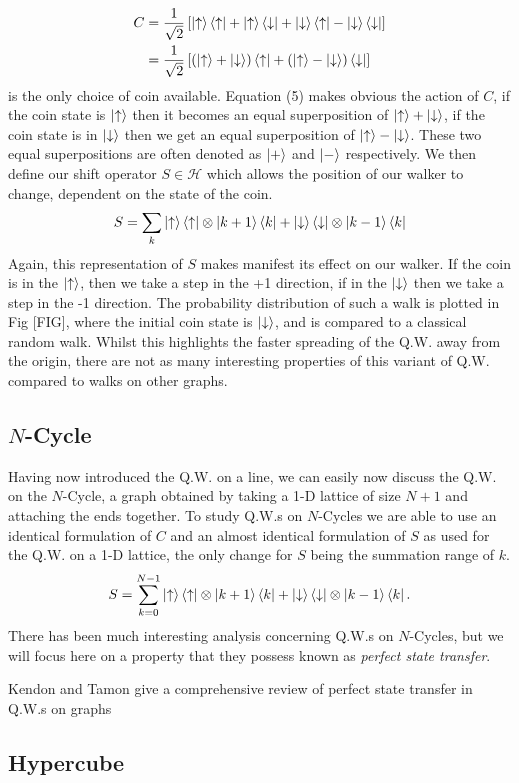 \begin{align}
    C &= \frac{1}{\sqrt{2}}\left[
    \ket{\uparrow}\bra{\uparrow} +
    \ket{\uparrow}\bra{\downarrow} +
    \ket{\downarrow}\bra{\uparrow} -
    \ket{\downarrow}\bra{\downarrow}\right]\\
    &= \frac{1}{\sqrt{2}}\left[(\ket{\uparrow} + \ket{\downarrow})\bra{\uparrow} +
    (\ket{\uparrow} - \ket{\downarrow})\bra{\downarrow}\right]
\end{align}
is the only choice of coin available. 
Equation (5) makes obvious the action of $C$, if the coin state is $\ket{\uparrow}$ then it becomes an equal superposition of $\ket{\uparrow} + \ket{\downarrow}$, if the coin state is in $\ket{\downarrow}$ then we get an equal superposition of $\ket{\uparrow} - \ket{\downarrow}$. 
These two equal superpositions are often denoted as $\ket{+}$ and $\ket{-}$ respectively.\newline
We then define our shift operator $S \in \mathcal{H}$ which allows the position of our walker to change, dependent on the state of the coin.
\begin{equation}
    S = \sum_k \ket{\uparrow}\bra{\uparrow} \otimes \ket{k + 1}\bra{k} + \ket{\downarrow}\bra{\downarrow} \otimes \ket{k - 1}\bra{k}
\end{equation}
Again, this representation of $S$ makes manifest its effect on our walker. 
If the coin is in the $\ket{\uparrow}$, then we take a step in the +1 direction, if in the $\ket{\downarrow}$ then we take a step in the -1 direction. 
The probability distribution of such a walk is plotted in Fig [FIG], where the initial coin state is $\ket{\downarrow}$, and is compared to a classical random walk. Whilst this highlights the faster spreading of the Q.W. away from the origin, there are not as many interesting properties of this variant of Q.W. compared to walks on other graphs.
\subsection{$N$-Cycle}
Having now introduced the Q.W. on a line, we can easily now discuss the Q.W. on the $N$-Cycle, a graph obtained by taking a 1-D lattice of size $N + 1$ and attaching the ends together. To study Q.W.s on $N$-Cycles we are able to use an identical formulation of $C$ and an almost identical formulation of $S$ as used for the Q.W. on a 1-D lattice, the only change for $S$ being the summation range of $k$.
\begin{equation}
    S = \sum_{k=0}^{N - 1}\ket{\uparrow}\bra{\uparrow} \otimes \ket{k + 1}\bra{k} + \ket{\downarrow}\bra{\downarrow} \otimes \ket{k - 1}\bra{k}.
\end{equation}
There has been much interesting analysis concerning Q.W.s on $N$-Cycles, but we will focus here on a property that they possess known as \emph{perfect state transfer}.\newline

Kendon and Tamon give a comprehensive review of perfect state transfer in Q.W.s on graphs \cite{kendon2010} 
\subsection{Hypercube}
\lipsum[1]